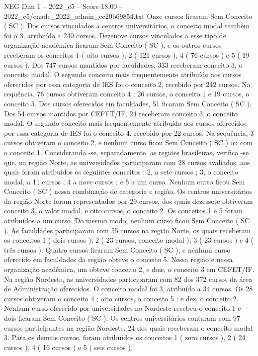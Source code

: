\begin{textsample}{NEG Dim 1 – 2022\_c5 – Score 18.00 – 2022\_c5/enade\_2022\_admin\_cc20b69854.txt}
Onze cursos ficaram Sem Conceito ( SC ).
Dos cursos vinculados a centros universitários, o conceito modal também foi o 3, atribuído a 240 cursos.
Dezenove cursos vinculados a esse tipo de organização acadêmica ficaram Sem Conceito ( SC ), e os outros cursos receberam os conceitos 1 ( oito cursos ), 2 ( 121 cursos ), 4 ( 76 cursos ) e 5 ( 19 cursos ).
Dos 747 cursos mantidos por faculdades, 333 receberam conceito 3, o conceito modal.
O segundo conceito mais frequentemente atribuído aos cursos oferecidos por essa categoria de IES foi o conceito 2, recebido por 242 cursos.
Na sequência, 76 cursos obtiveram conceito 4 ; 26 cursos, o conceito 1 e 19 cursos, o conceito 5.
Dos cursos oferecidos em faculdades, 51 ficaram Sem Conceito ( SC ).
Dos 54 cursos mantidos por CEFET/IF, 24 receberam conceito 3, o conceito modal.
O segundo conceito mais frequentemente atribuído aos cursos oferecidos por essa categoria de IES foi o conceito 4, recebido por 22 cursos.
Na sequência, 3 cursos obtiveram o conceito 2, e nenhum curso ficou Sem Conceito ( SC ) ou com o conceito 1.
Considerando -se, separadamente, as regiões brasileiras, verifica -se que, na região Norte, as universidades participaram com 28 cursos avaliados, aos quais foram atribuídos os seguintes conceitos : 2, a sete cursos ; 3, o conceito modal, a 11 cursos ; 4 a nove cursos ; e 5 a um curso.
Nenhum curso ficou Sem Conceito ( SC ) nessa combinação de categoria e região.
Os centros universitários da região Norte foram representados por 29 cursos, dos quais dezessete obtiveram conceito 3, o valor modal, e oito cursos, o conceito 2.
Os conceitos 1 e 5 foram atribuídos a um curso.
Do mesmo modo, nenhum curso ficou Sem Conceito ( SC ).
As faculdades participaram com 55 cursos na região Norte, os quais receberam os conceitos 1 ( dois cursos ), 2 ( 23 cursos, conceito modal ), 3 ( 23 cursos ) e 4 ( três cursos ).
Quatro cursos ficaram Sem Conceito ( SC ), e nenhum curso oferecido em faculdades da região obteve o conceito 5.
Nessa região e nessa organização acadêmica, um obteve conceito 2, e dois, o conceito 3 em CEFET/IF.
Na região Nordeste, as universidades participaram com 82 dos 372 cursos da área de Administração oferecidos.
O conceito modal foi 3, atribuído a 34 cursos.
Os 28 cursos obtiveram o conceito 4 ; oito cursos, o conceito 5 ; e dez, o conceito 2.
Nenhum curso oferecido por universidades no Nordeste recebeu o conceito 1 e dois ficaram Sem Conceito ( SC ).
Os centros universitários contaram com 97 cursos participantes na região Nordeste, 24 dos quais receberam o conceito modal 3.
Para os demais cursos, foram atribuídos os conceitos 1 ( zero cursos ), 2 ( 24 cursos ), 4 ( 16 cursos ) e 5 ( seis cursos ).

\end{textsample}

